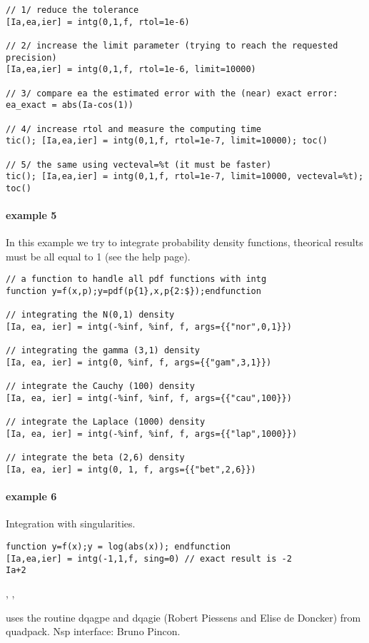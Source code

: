 \begin{examples}
\begin{Verbatim}
// 1/ reduce the tolerance
[Ia,ea,ier] = intg(0,1,f, rtol=1e-6)

// 2/ increase the limit parameter (trying to reach the requested precision)
[Ia,ea,ier] = intg(0,1,f, rtol=1e-6, limit=10000)

// 3/ compare ea the estimated error with the (near) exact error:
ea_exact = abs(Ia-cos(1))

// 4/ increase rtol and measure the computing time
tic(); [Ia,ea,ier] = intg(0,1,f, rtol=1e-7, limit=10000); toc()

// 5/ the same using vecteval=%t (it must be faster)
tic(); [Ia,ea,ier] = intg(0,1,f, rtol=1e-7, limit=10000, vecteval=%t); toc()
\end{Verbatim}

  
\paragraph{example 5} In this example we try to integrate probability 
density functions, theorical results must be all equal to 1 (see the
 help page). 
\begin{Verbatim}
// a function to handle all pdf functions with intg
function y=f(x,p);y=pdf(p{1},x,p{2:$});endfunction

// integrating the N(0,1) density
[Ia, ea, ier] = intg(-%inf, %inf, f, args={{"nor",0,1}})

// integrating the gamma (3,1) density
[Ia, ea, ier] = intg(0, %inf, f, args={{"gam",3,1}})

// integrate the Cauchy (100) density
[Ia, ea, ier] = intg(-%inf, %inf, f, args={{"cau",100}})

// integrate the Laplace (1000) density
[Ia, ea, ier] = intg(-%inf, %inf, f, args={{"lap",1000}})

// integrate the beta (2,6) density
[Ia, ea, ier] = intg(0, 1, f, args={{"bet",2,6}})
\end{Verbatim}
  
\paragraph{example 6} Integration with singularities.
\begin{Verbatim}
function y=f(x);y = log(abs(x)); endfunction
[Ia,ea,ier] = intg(-1,1,f, sing=0) // exact result is -2
Ia+2
\end{Verbatim}

\end{examples}

\begin{manseealso}
  , ,    
\end{manseealso}

\begin{authors}
  uses the routine dqagpe and dqagie (Robert Piessens and Elise de Doncker) from
  quadpack. Nsp interface: Bruno Pincon.
\end{authors}
